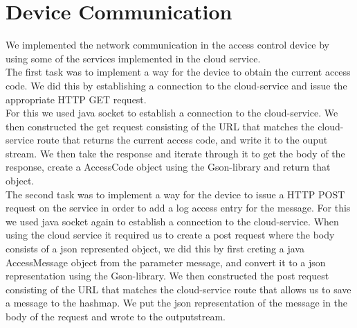 \section{Device Communication}
We implemented the network communication in the access control device by using some of the services implemented in the cloud service.\\

The first task was to implement a way for the device to obtain the current access code. We did this by establishing a connection to the cloud-service and issue the appropriate HTTP GET request.
\\
For this we used java socket to establish a connection to the cloud-service. We then constructed the get request consisting of the URL that matches the cloud-service route that returns the current access code, and write it to the ouput stream. We then take the response and iterate through it to get the body of the response, create a AccessCode object using the Gson-library and return that object.\\

The second task was to implement a way for the device to  issue a HTTP POST request on the service in order to add a log access entry for the message.
For this we used java socket again to establish a connection to the cloud-service. When using the cloud service it required us to create a post request where the body consists of a json represented object, we did this by first creting a java AccessMessage object from the parameter message, and convert it to a json representation using the Gson-library. We then constructed the post request consisting of the URL that matches the cloud-service route that allows us to save a message to the hashmap. We  put the json representation of the message in the body of the request and wrote to the outputstream.
   
